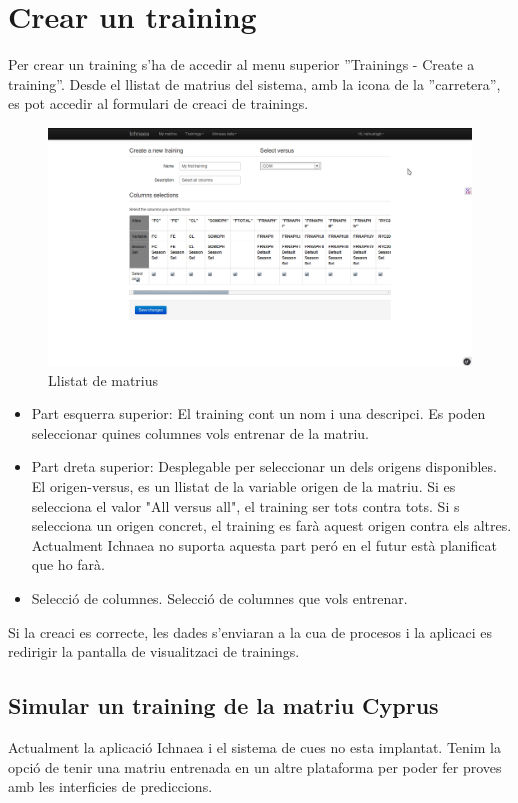 \section{Crear un training}
Per crear un training s'ha de accedir al menu superior ''Trainings - Create a training''. Desde el llistat de matrius del sistema, amb la icona de la ''carretera'', es pot accedir al formulari de creaci de trainings.
\begin{figure}[h!]
  \centering
  \includegraphics[scale=0.2]{img/userguide/training_create.png}
  \caption{Llistat de matrius}
  \label{fig:placement}
\end{figure}
\begin{itemize}
\item Part esquerra superior: El training cont un nom i una descripci. Es poden seleccionar quines columnes vols entrenar de la matriu. 
\item Part dreta superior: Desplegable per seleccionar un dels origens disponibles.  El origen-versus, es un llistat de la variable origen de la matriu. Si es selecciona el valor "All versus all", el training ser tots contra tots. Si s selecciona un origen concret, el training es far\`{a} aquest origen contra els altres. Actualment Ichnaea no suporta aquesta part per\'{o} en el futur est\`{a} planificat que ho far\`{a}.
\item Selecci\'{o} de columnes. Selecci\'{o} de columnes que vols entrenar.
\end{itemize}

Si la creaci \´e{s} correcte, les dades s'enviaran a la cua de procesos i la aplicaci es redirigir la pantalla de visualitzaci de trainings.

\subsection{Simular un training de la matriu Cyprus}
Actualment la aplicaci\'{o} Ichnaea i el sistema de cues no esta implantat. Tenim la opci\'{o} de tenir una matriu entrenada en un altre plataforma per poder fer proves amb les interficies de prediccions. 


